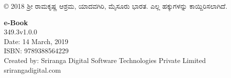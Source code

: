 \thispagestyle{empty}

© 2018 ಶ‍್ರೀ ರಾಮಕೃಷ್ಣ ಆಶ್ರಮ, ಯಾದವಗಿರಿ, ಮೈಸೂರು ಭಾರತ. ಎಲ್ಲ ಹಕ್ಕುಗಳನ್ನು ಕಾಯ್ದಿರಿಸಲಾಗಿದೆ.

 \textbf{e-Book}\\
 349.3v1.0.0\\
 Date: 14 March, 2019\\
 ISBN: 9789388564229\\
 Created by: Sriranga Digital Software Technologies Private Limited\\srirangadigital.com

